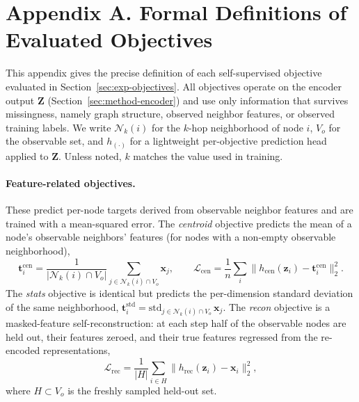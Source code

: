 \section*{Appendix A. Formal Definitions of Evaluated Objectives}
\label{app:objectives}

This appendix gives the precise definition of each self-supervised objective evaluated in Section~\ref{sec:exp-objectives}. All objectives operate on the encoder output $\mathbf{Z}$ (Section~\ref{sec:method-encoder}) and use only information that survives missingness, namely graph structure, observed neighbor features, or observed training labels. We write $\mathcal{N}_k(i)$ for the $k$-hop neighborhood of node $i$, $V_o$ for the observable set, and $h_{(\cdot)}$ for a lightweight per-objective prediction head applied to $\mathbf{Z}$. Unless noted, $k$ matches the value used in training.

\paragraph{Feature-related objectives.} These predict per-node targets derived from observable neighbor features and are trained with a mean-squared error.
The \emph{centroid} objective predicts the mean of a node's observable neighbors' features (for nodes with a non-empty observable neighborhood),
\begin{equation}
    \mathbf{t}^{\text{cen}}_i = \frac{1}{|\mathcal{N}_k(i)\cap V_o|}\!\!\sum_{j\in\mathcal{N}_k(i)\cap V_o}\!\!\mathbf{x}_j,
    \qquad
    \mathcal{L}_{\text{cen}} = \frac{1}{n}\sum_i \big\|h_{\text{cen}}(\mathbf{z}_i)-\mathbf{t}^{\text{cen}}_i\big\|_2^2 .
\end{equation}
The \emph{stats} objective is identical but predicts the per-dimension standard deviation of the same neighborhood, $\mathbf{t}^{\text{std}}_i = \mathrm{std}_{j\in\mathcal{N}_k(i)\cap V_o}\,\mathbf{x}_j$.
The \emph{recon} objective is a masked-feature self-reconstruction: at each step half of the observable nodes are held out, their features zeroed, and their true features regressed from the re-encoded representations,
\begin{equation}
    \mathcal{L}_{\text{rec}} = \frac{1}{|H|}\sum_{i\in H}\big\|h_{\text{rec}}(\mathbf{z}_i)-\mathbf{x}_i\big\|_2^2 ,
\end{equation}
where $H\subset V_o$ is the freshly sampled held-out set.

